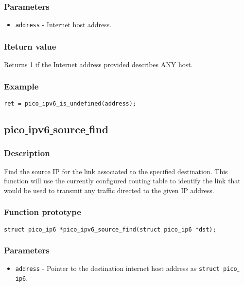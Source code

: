 \subsubsection*{Parameters}
\begin{itemize}[noitemsep]
\item \texttt{address} - Internet host address.
\end{itemize}
\subsubsection*{Return value}
Returns 1 if the Internet address provided describes ANY host.
\subsubsection*{Example}
\begin{verbatim}
ret = pico_ipv6_is_undefined(address);
\end{verbatim}


\subsection{pico$\_$ipv6$\_$source$\_$find}

\subsubsection*{Description}
Find the source IP for the link associated to the specified destination.
This function will use the currently configured routing table to identify the link that would be used to transmit any traffic directed to the given IP address.

\subsubsection*{Function prototype}
\begin{verbatim}
struct pico_ip6 *pico_ipv6_source_find(struct pico_ip6 *dst);
\end{verbatim}

\subsubsection*{Parameters}
\begin{itemize}[noitemsep]
\item \texttt{address} - Pointer to the destination internet host address as \texttt{struct pico$\_$ip6}.
\end{itemize}

